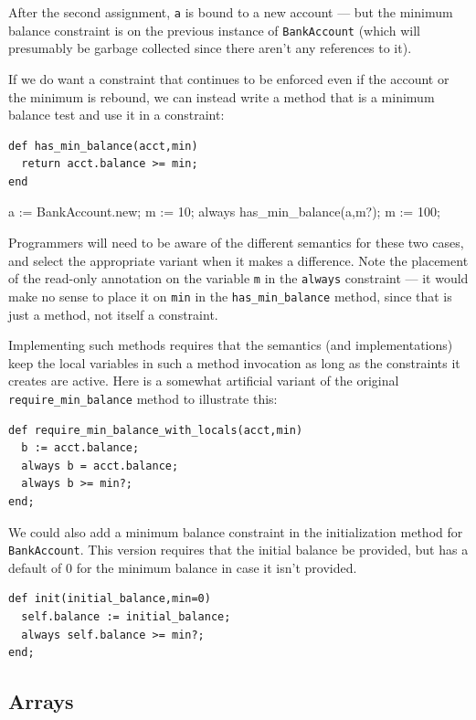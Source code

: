 \documentclass{article}
\begin{document}
After the second assignment,  \verb|a| is bound to a new account --- but
the minimum balance constraint is on the previous instance of
\verb|BankAccount| (which will presumably be garbage collected since
there aren't any references to it).  

If we do want a constraint that continues to be enforced even if the
account or the minimum is rebound, we can instead write a method that
is a minimum balance test and use it in a constraint:

\begin{verbatim}
def has_min_balance(acct,min)
  return acct.balance >= min;
end
\end{verbatim}

\begin{example}
a := BankAccount.new;
m := 10;
always has_min_balance(a,m?);
m := 100;
\end{example}

Programmers will need to be aware of the different semantics for these
two cases, and select the appropriate variant when it makes a
difference. Note the placement of the read-only annotation on the
variable \verb|m| in the \verb|always| constraint --- it would make no
sense to place it on \verb|min| in the \verb|has_min_balance| method,
since that is just a method, not itself a constraint.

Implementing such methods requires that the semantics (and
implementations) keep the local variables in such a method invocation
as long as the constraints it creates are active.  Here is a somewhat
artificial variant of the original \verb|require_min_balance|
method to illustrate this:
\begin{verbatim}
def require_min_balance_with_locals(acct,min)
  b := acct.balance;
  always b = acct.balance;
  always b >= min?;
end;
\end{verbatim}

We could also add a minimum balance constraint in the initialization
method for \verb|BankAccount|.  This version requires that the initial
balance be provided, but has a default of 0 for the minimum balance in
case it isn't provided.

\begin{verbatim}
def init(initial_balance,min=0)
  self.balance := initial_balance;
  always self.balance >= min?;
end;
\end{verbatim}

\subsection{Arrays}
\end{document}
